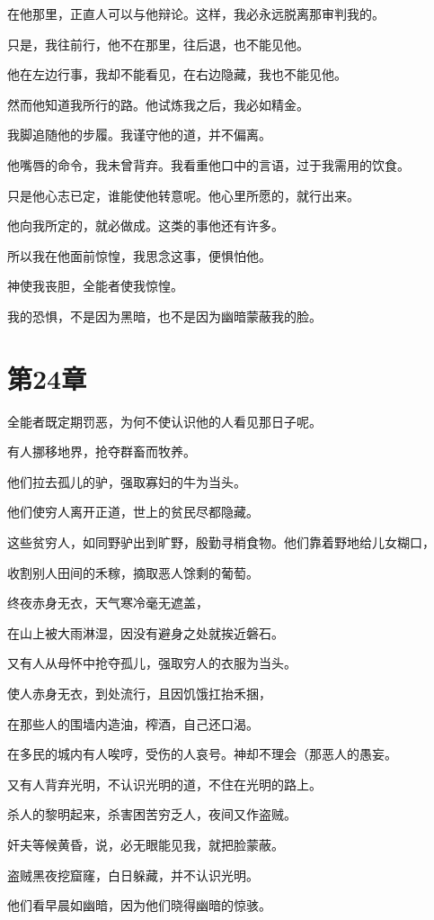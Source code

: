 \documentclass[12pt,oneside]{book}
\begin{document}
在他那里，正直人可以与他辩论。这样，我必永远脱离那审判我的。

只是，我往前行，他不在那里，往后退，也不能见他。

他在左边行事，我却不能看见，在右边隐藏，我也不能见他。

然而他知道我所行的路。他试炼我之后，我必如精金。

我脚追随他的步履。我谨守他的道，并不偏离。

他嘴唇的命令，我未曾背弃。我看重他口中的言语，过于我需用的饮食。

只是他心志已定，谁能使他转意呢。他心里所愿的，就行出来。

他向我所定的，就必做成。这类的事他还有许多。

所以我在他面前惊惶，我思念这事，便惧怕他。

神使我丧胆，全能者使我惊惶。

我的恐惧，不是因为黑暗，也不是因为幽暗蒙蔽我的脸。


\chapter{第24章}
全能者既定期罚恶，为何不使认识他的人看见那日子呢。

有人挪移地界，抢夺群畜而牧养。

他们拉去孤儿的驴，强取寡妇的牛为当头。

他们使穷人离开正道，世上的贫民尽都隐藏。

这些贫穷人，如同野驴出到旷野，殷勤寻梢食物。他们靠着野地给儿女糊口，

收割别人田间的禾稼，摘取恶人馀剩的葡萄。

终夜赤身无衣，天气寒冷毫无遮盖，

在山上被大雨淋湿，因没有避身之处就挨近磐石。

又有人从母怀中抢夺孤儿，强取穷人的衣服为当头。

使人赤身无衣，到处流行，且因饥饿扛抬禾捆，

在那些人的围墙内造油，榨酒，自己还口渴。

在多民的城内有人唉哼，受伤的人哀号。神却不理会（那恶人的愚妄。

又有人背弃光明，不认识光明的道，不住在光明的路上。

杀人的黎明起来，杀害困苦穷乏人，夜间又作盗贼。

奸夫等候黄昏，说，必无眼能见我，就把脸蒙蔽。

盗贼黑夜挖窟窿，白日躲藏，并不认识光明。

他们看早晨如幽暗，因为他们晓得幽暗的惊骇。
\end{document}
